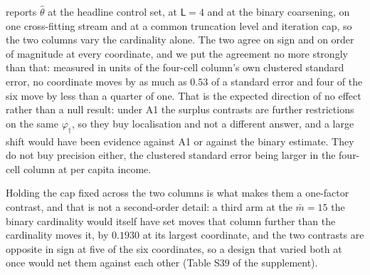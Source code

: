 \documentclass[
  12pt]{article}
\newcommand{\1}[1]{\mathds{1}\left[#1\right]}
\theoremstyle{plain}
\theoremstyle{definition}
\theoremstyle{definition}
\theoremstyle{remark}
\newcommand{\vdagger}{\varphi_{\dagger}}
\begin{document}
 reports \(\hat\theta\) at the headline control set,
at \(\mathsf L=4\) and at the binary coarsening, on one cross-fitting
stream and at a common truncation level and iteration cap, so the two
columns vary the cardinality alone. The two agree on sign and on order
of magnitude at every coordinate, and we put the agreement no more
strongly than that: measured in units of the four-cell column's own
clustered standard error, no coordinate moves by as much as \(0.53\) of
a standard error and four of the six move by less than a quarter of one.
That is the expected direction of no effect rather than a null result:
under A1 the surplus contrasts are further restrictions on the same
\(\vdagger\), so they buy localisation and not a different answer, and a
large shift would have been evidence against A1 or against the binary
estimate. They do not buy precision either, the clustered standard error
being larger in the four-cell column at per capita income.

Holding the cap fixed across the two columns is what makes them a
one-factor contrast, and that is not a second-order detail: a third arm
at the \(\bar m=15\) the binary cardinality would itself have set moves
that column further than the cardinality moves it, by \(0.1930\) at its
largest coordinate, and the two contrasts are opposite in sign at five
of the six coordinates, so a design that varied both at once would net
them against each other (Table S39 of the supplement).
\end{document}
